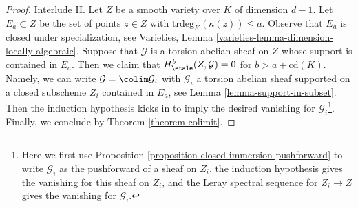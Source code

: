 \begin{proof}
\medskip\noindent
Interlude II. Let $Z$ be a smooth variety over $K$ of dimension $d - 1$.
Let $E_a \subset Z$ be the set of points $z \in Z$ with
$\text{trdeg}_K(\kappa(z)) \leq a$. Observe that $E_a$ is closed
under specialization, see
Varieties, Lemma \ref{varieties-lemma-dimension-locally-algebraic}.
Suppose that $\mathcal{G}$ is a torsion abelian sheaf on $Z$
whose support is contained in $E_a$. Then we claim that
$H^b_\etale(Z, \mathcal{G}) = 0$ for $b > a + \text{cd}(K)$.
Namely, we can write $\mathcal{G} = \colim \mathcal{G}_i$
with $\mathcal{G}_i$ a torsion abelian sheaf
supported on a closed subscheme $Z_i$ contained in $E_a$, see
Lemma \ref{lemma-support-in-subset}.
Then the induction hypothesis kicks in to imply
the desired vanishing for $\mathcal{G}_i$\footnote{Here
we first use Proposition \ref{proposition-closed-immersion-pushforward}
to write $\mathcal{G}_i$ as the pushforward of a sheaf on $Z_i$,
the induction hypothesis gives the vanishing for this sheaf on $Z_i$, and
the Leray spectral sequence for $Z_i \to Z$ gives the vanishing
for $\mathcal{G}_i$.}. Finally, we
conclude by Theorem \ref{theorem-colimit}.


\end{proof}
